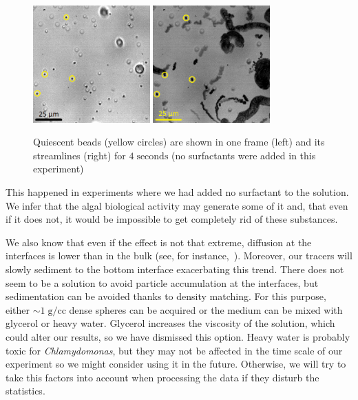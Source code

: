 \begin{figure}[H]
	\centering
	\includegraphics[width=0.4\textwidth]{archivos/190726_H2O_0_18p5um_0001.png}
	\includegraphics[width=0.4\textwidth]{archivos/190726_H2O_0_18p5um_MIN200.png}
	\caption{Quiescent beads (yellow circles) are shown in one frame (left) and its streamlines (right) for $4 \; \textrm{seconds}$ (no surfactants were added in this experiment)}
	\label{quiescent_beads}
\end{figure}

This happened in experiments where we had added no surfactant to the solution. We infer that the algal biological activity may generate some of it and, that even if it does not, it would be impossible to get completely rid of these substances.

We also know that even if the effect is not that extreme, diffusion at the interfaces is lower than in the bulk (see, for instance,~\cite{peng2009}). Moreover, our tracers will slowly sediment to the bottom interface exacerbating this trend. There does not seem to be a solution to avoid particle accumulation at the interfaces, but sedimentation can be avoided thanks to density matching. For this purpose, either  $\sim 1 \; \textrm{g/cc}$ dense spheres can be acquired or the medium can be mixed with glycerol or heavy water. Glycerol increases the viscosity of the solution, which could alter our results, so we have dismissed this option. Heavy water is probably toxic for \textit{Chlamydomonas}, but they may not be affected in the time scale of our experiment so we might consider using it in the future. Otherwise, we will try to take this factors into account when processing the data if they disturb the statistics.

